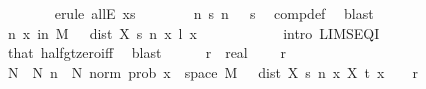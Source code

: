 \begin{isabellebody}
\ \ \ \ \ \ \isamarkupfalse%
\ {\isacharparenleft}{\kern0pt}erule\ allE{\isacharbrackleft}{\kern0pt}\ x{\isacharequal}{\kern0pt}s{\isacharbrackright}{\kern0pt}{\isacharparenright}{\kern0pt}\isanewline
\ \ \ \ \ \ \isamarkupfalse%
\ {\isacartoucheopen}{\isasymforall}n{\isachardot}{\kern0pt}\ s\ n\ {\isasymin}\ {\isacharbraceleft}{\kern0pt}{}{\isachardot}{\kern0pt}{\isachardot}{\kern0pt}{\isacharbraceright}{\kern0pt}{\isacartoucheclose}\ s\ \isamarkupfalse%
\ comp{\isacharunderscore}{\kern0pt}def\ \isamarkupfalse%
\ blast\isanewline
\ \ \ \ \ \ \isamarkupfalse%
\isanewline
\ \ \isamarkupfalse%
\isanewline
\ \ \isamarkupfalse%
\ {\isachardoublequoteopen}{\isacharparenleft}{\kern0pt}{\isasymlambda}n{\isachardot}{\kern0pt}\ {\isasymP}{\isacharparenleft}{\kern0pt}x\ in\ M{\isachardot}{\kern0pt}\ {\isasymepsilon}\ {\isacharless}{\kern0pt}\ dist\ {\isacharparenleft}{\kern0pt}X\ {\isacharparenleft}{\kern0pt}s\ n{\isacharparenright}{\kern0pt}\ x{\isacharparenright}{\kern0pt}\ {\isacharparenleft}{\kern0pt}l\ x{\isacharparenright}{\kern0pt}{\isacharparenright}{\kern0pt}{\isacharparenright}{\kern0pt}\ {\isasymlonglonglongrightarrow}\ {}{\isachardoublequoteclose}\ \ {\isachardoublequoteopen}{\isasymepsilon}\ {\isachargreater}{\kern0pt}\ {}{\isachardoublequoteclose}\ \ {\isasymepsilon}\isanewline
\ \ \isamarkupfalse%
\ {\isacharparenleft}{\kern0pt}intro\ LIMSEQ{\isacharunderscore}{\kern0pt}I{\isacharparenright}{\kern0pt}\isanewline
\ \ \ \ \isamarkupfalse%
\ {\isachardoublequoteopen}{\isasymepsilon}\ {\isacharslash}{\kern0pt}\ {}\ {\isachargreater}{\kern0pt}\ {}{\isachardoublequoteclose}\isanewline
\ \ \ \ \ \ \isamarkupfalse%
\ that\ half{\isacharunderscore}{\kern0pt}gt{\isacharunderscore}{\kern0pt}zero{\isacharunderscore}{\kern0pt}iff\ \isamarkupfalse%
\ blast\isanewline
\ \ \ \ \isamarkupfalse%
\ r\ {\isacharcolon}{\kern0pt}{\isacharcolon}{\kern0pt}\ real\ \isamarkupfalse%
\ {\isachardoublequoteopen}{}\ {\isacharless}{\kern0pt}\ r{\isachardoublequoteclose}\isanewline
\ \ \ \ \isamarkupfalse%
\ N\ \ N{\isacharcolon}{\kern0pt}\ {\isachardoublequoteopen}{\isasymforall}n\ {\isasymge}\ N{\isachardot}{\kern0pt}\ norm\ {\isacharparenleft}{\kern0pt}prob\ {\isacharbraceleft}{\kern0pt}x\ {\isasymin}\ space\ M{\isachardot}{\kern0pt}\ {\isasymepsilon}{\isacharslash}{\kern0pt}{}\ {\isacharless}{\kern0pt}\ dist\ {\isacharparenleft}{\kern0pt}X\ {\isacharparenleft}{\kern0pt}s\ n{\isacharparenright}{\kern0pt}\ x{\isacharparenright}{\kern0pt}\ {\isacharparenleft}{\kern0pt}X\ t\ x{\isacharparenright}{\kern0pt}{\isacharbraceright}{\kern0pt}\ {\isacharminus}{\kern0pt}\ {}{\isacharparenright}{\kern0pt}\ {\isacharless}{\kern0pt}\ r{\isachardoublequoteclose}\isanewline

\end{isabellebody}
